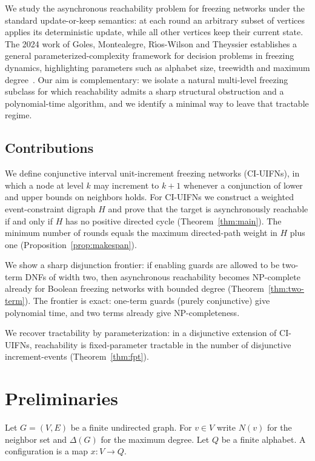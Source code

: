 \documentclass[final,3p,times]{elsarticle}
\theoremstyle{definition}
\theoremstyle{remark}
\begin{document}
We study the asynchronous reachability problem for freezing networks under the standard update-or-keep semantics: at each round an arbitrary subset of vertices applies its deterministic update, while all other vertices keep their current state.
The 2024 work of Goles, Montealegre, R{\'\i}os-Wilson and Theyssier establishes a general parameterized-complexity framework for decision problems in freezing dynamics, highlighting parameters such as alphabet size, treewidth and maximum degree~\cite{goles2024parameterized}.
Our aim is complementary: we isolate a natural multi-level freezing subclass for which reachability admits a sharp structural obstruction and a polynomial-time algorithm, and we identify a minimal way to leave that tractable regime.

\subsection{Contributions}

We define conjunctive interval unit-increment freezing networks (CI-UIFNs), in which a node at level $k$ may increment to $k{+}1$ whenever a conjunction of lower and upper bounds on neighbors holds.
For CI-UIFNs we construct a weighted event-constraint digraph $H$ and prove that the target is asynchronously reachable if and only if $H$ has no positive directed cycle (Theorem~\ref{thm:main}).
The minimum number of rounds equals the maximum directed-path weight in $H$ plus one (Proposition~\ref{prop:makespan}).

We show a sharp disjunction frontier: if enabling guards are allowed to be two-term DNFs of width two, then asynchronous reachability becomes NP-complete already for Boolean freezing networks with bounded degree (Theorem~\ref{thm:two-term}).
The frontier is exact: one-term guards (purely conjunctive) give polynomial time, and two terms already give NP-completeness.

We recover tractability by parameterization: in a disjunctive extension of CI-UIFNs, reachability is fixed-parameter tractable in the number of disjunctive increment-events (Theorem~\ref{thm:fpt}).

\section{Preliminaries}

Let $G=(V,E)$ be a finite undirected graph.
For $v\in V$ write $N(v)$ for the neighbor set and $\Delta(G)$ for the maximum degree.
Let $Q$ be a finite alphabet.
A configuration is a map $x\colon V\to Q$.
\end{document}
